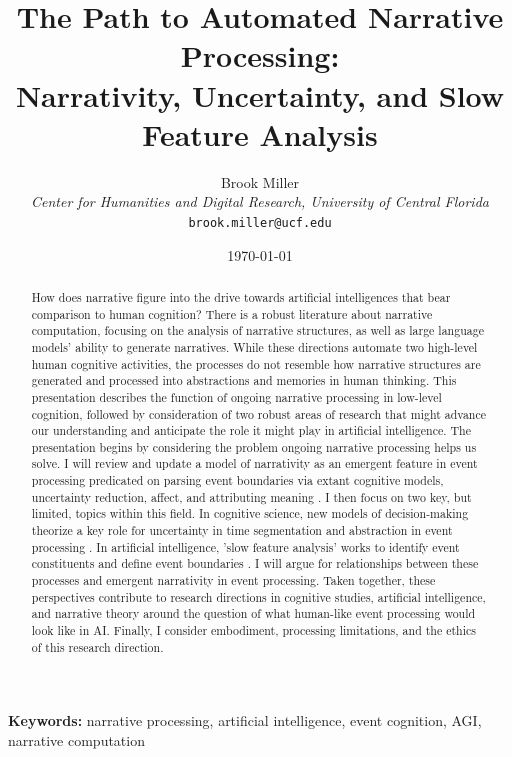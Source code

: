 \documentclass[11pt,a4paper]{article}
\title{The Path to Automated Narrative Processing: \\
       Narrativity, Uncertainty, and Slow Feature Analysis}
\author{Brook Miller\\
        \textit{Center for Humanities and Digital Research, University of Central Florida}\\
        \texttt{brook.miller@ucf.edu}}
\date{\today}
\begin{document}
\maketitle

\begin{abstract}
How does narrative figure into the drive towards artificial intelligences that bear comparison to human cognition? There is a robust literature about narrative computation, focusing on the analysis of narrative structures, as well as large language models' ability to generate narratives. While these directions automate two high-level human cognitive activities, the processes do not resemble how narrative structures are generated and processed into abstractions and memories in human thinking. This presentation describes the function of ongoing narrative processing in low-level cognition, followed by consideration of two robust areas of research that might advance our understanding and anticipate the role it might play in artificial intelligence. The presentation begins by considering the problem ongoing narrative processing helps us solve. I will review and update a model of narrativity as an emergent feature in event processing predicated on parsing event boundaries via extant cognitive models, uncertainty reduction, affect, and attributing meaning \citep{miller2024narrativity}. I then focus on two key, but limited, topics within this field. In cognitive science, new models of decision-making theorize a key role for uncertainty in time segmentation and abstraction in event processing \citep{wang2025neural}. In artificial intelligence, 'slow feature analysis' works to identify event constituents and define event boundaries \citep{song2022slow}. I will argue for relationships between these processes and emergent narrativity in event processing. Taken together, these perspectives contribute to research directions in cognitive studies, artificial intelligence, and narrative theory around the question of what human-like event processing would look like in AI. Finally, I consider embodiment, processing limitations, and the ethics of this research direction.
\end{abstract}

\textbf{Keywords:} narrative processing, artificial intelligence, event cognition, AGI, narrative computation




\end{document}
